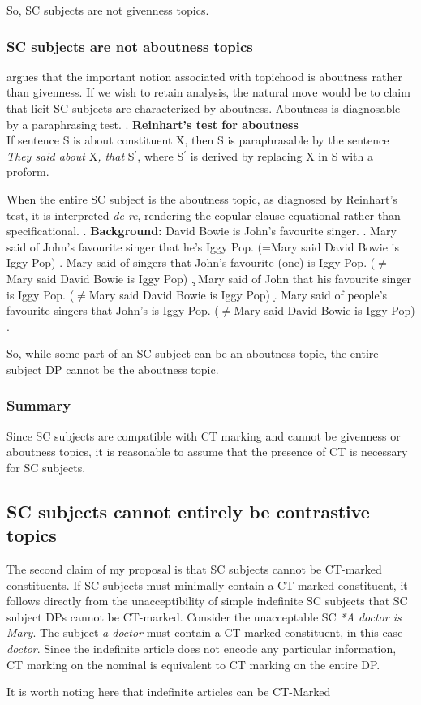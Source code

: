 \documentclass[GPFinal]{subfiles}
\begin{document}
So, SC subjects are not givenness topics.
\subsubsection{SC subjects are not aboutness topics}
\textcite{reinhart1981pragmatics} argues that the important notion associated with topichood is aboutness rather than givenness.
If we wish to retain  analysis, the natural move would be to claim that licit SC subjects are characterized by aboutness.
Aboutness is diagnosable by a paraphrasing test.
\ex. \textbf{Reinhart's test for aboutness}\\
If sentence S is about constituent X, then S is paraphrasable by the sentence \textit{They said about }X\textit{, that }S$^\prime$, where S$^\prime$ is derived by replacing X in S with a proform.

When the entire SC subject is the aboutness topic, as diagnosed by Reinhart's test, it is interpreted \textit{de re}, rendering the copular clause equational rather than specificational.
\ex. \textbf{Background:} David Bowie is John's favourite singer.
\a. Mary said of John's favourite singer that he's Iggy Pop. (=Mary said David Bowie is Iggy Pop)
\b. Mary said of singers that John's favourite (one) is Iggy Pop. ($\neq$Mary said David Bowie is Iggy Pop)
\c. Mary said of John that his favourite singer is Iggy Pop. ($\neq$Mary said David Bowie is Iggy Pop)
\d. Mary said of people's favourite singers that John's is Iggy Pop. ($\neq$Mary said David Bowie is Iggy Pop)
\z.

So, while some part of an SC subject can be an aboutness topic, the entire subject DP cannot be the aboutness topic.
\subsubsection{Summary}
Since SC subjects are compatible with CT marking and cannot be givenness or aboutness topics, it is reasonable to assume that the presence of CT is necessary for SC subjects.
\subsection{SC subjects cannot entirely be contrastive topics}
The second claim of my proposal is that SC subjects cannot be CT-marked constituents.
If SC subjects must minimally contain a CT marked constituent, it follows directly from the unacceptibility of simple indefinite SC subjects that SC subject DPs cannot be CT-marked.
Consider the unacceptable SC \textit{*A doctor is Mary}.
The subject \textit{a doctor} must contain a CT-marked constituent, in this case \textit{doctor}.
Since the indefinite article does not encode any particular information, CT marking on the nominal is equivalent to CT marking on the entire DP.

It is worth noting here that indefinite articles can be CT-Marked 
\end{document}
